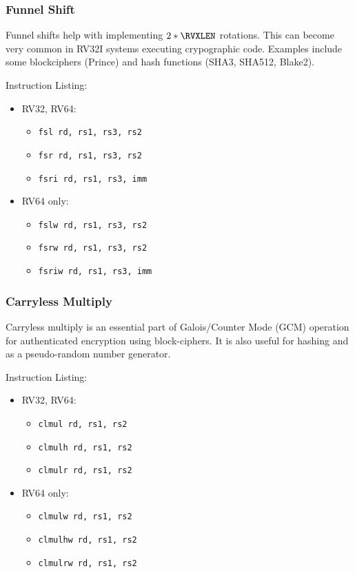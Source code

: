 \subsubsection{Funnel Shift}
Funnel shifts help with implementing $2*\RVXLEN$ rotations.
This can become very common in RV32I systems executing crypographic code.
Examples include some blockciphers (Prince) and
hash functions (SHA3, SHA512, Blake2).

Instruction Listing:
\begin{itemize}
\item RV32, RV64:
\begin{itemize}
\item {\tt fsl  rd, rs1, rs3, rs2}
\item {\tt fsr  rd, rs1, rs3, rs2}
\item {\tt fsri rd, rs1, rs3, imm}
\end{itemize}
\item RV64 only:
\begin{itemize}
\item {\tt fslw  rd, rs1, rs3, rs2}
\item {\tt fsrw  rd, rs1, rs3, rs2}
\item {\tt fsriw rd, rs1, rs3, imm}
\end{itemize}
\end{itemize}


\subsubsection{Carryless Multiply}
Carryless multiply is an essential part of Galois/Counter Mode (GCM)
operation for authenticated encryption using block-ciphers.
It is also useful for hashing and as a pseudo-random number generator.

Instruction Listing:
\begin{itemize}
\item RV32, RV64:
\begin{itemize}
\item {\tt clmul  rd, rs1, rs2}
\item {\tt clmulh rd, rs1, rs2}
\item {\tt clmulr rd, rs1, rs2}
\end{itemize}
\item RV64 only:
\begin{itemize}
\item {\tt clmulw  rd, rs1, rs2}
\item {\tt clmulhw rd, rs1, rs2}
\item {\tt clmulrw rd, rs1, rs2}
\end{itemize}
\end{itemize}

